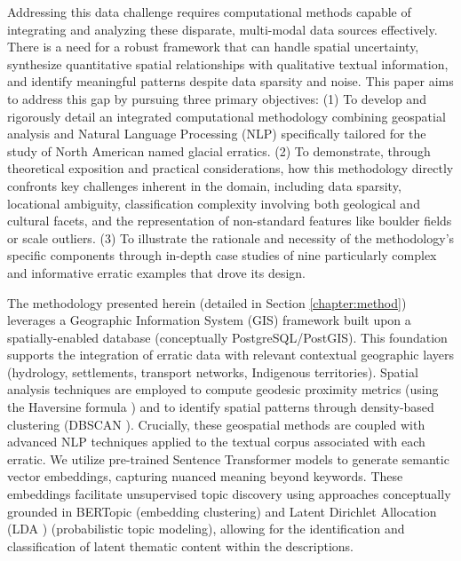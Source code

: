 \documentclass[
11pt, %
english, %
singlespacing, %
headsepline, %
]{MastersDoctoralThesis} %
\begin{document}
Addressing this data challenge requires computational methods capable of integrating and analyzing these disparate, multi-modal data sources effectively. There is a need for a robust framework that can handle spatial uncertainty, synthesize quantitative spatial relationships with qualitative textual information, and identify meaningful patterns despite data sparsity and noise. This paper aims to address this gap by pursuing three primary objectives: (1) To develop and rigorously detail an integrated computational methodology combining geospatial analysis and Natural Language Processing (NLP) specifically tailored for the study of North American named glacial erratics. (2) To demonstrate, through theoretical exposition and practical considerations, how this methodology directly confronts key challenges inherent in the domain, including data sparsity, locational ambiguity, classification complexity involving both geological and cultural facets, and the representation of non-standard features like boulder fields or scale outliers. (3) To illustrate the rationale and necessity of the methodology's specific components through in-depth case studies of nine particularly complex and informative erratic examples that drove its design.

The methodology presented herein (detailed in Section \ref{chapter:method}) leverages a Geographic Information System (GIS) framework built upon a spatially-enabled database (conceptually PostgreSQL/PostGIS). This foundation supports the integration of erratic data with relevant contextual geographic layers (hydrology, settlements, transport networks, Indigenous territories). Spatial analysis techniques are employed to compute geodesic proximity metrics (using the Haversine formula \cite{Sinnott1984}) and to identify spatial patterns through density-based clustering (DBSCAN \cite{Ester1996}). Crucially, these geospatial methods are coupled with advanced NLP techniques applied to the textual corpus associated with each erratic. We utilize pre-trained Sentence Transformer models \cite{Reimers2019} to generate semantic vector embeddings, capturing nuanced meaning beyond keywords. These embeddings facilitate unsupervised topic discovery using approaches conceptually grounded in BERTopic \cite{Grootendorst2022} (embedding clustering) and Latent Dirichlet Allocation (LDA \cite{Blei2003}) (probabilistic topic modeling), allowing for the identification and classification of latent thematic content within the descriptions.
\end{document}
